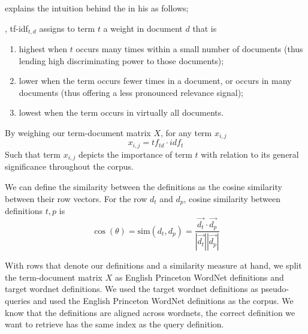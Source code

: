 \citeauthor{manning_introduction_2009} explains the intuition behind the \tfidf{} in his  as follows;
\begin{displayquote}
    \textelp{}, tf-idf$_{t,d}$ assigns to term $t$ a weight in document $d$ that is
    \begin{enumerate}
        \item highest when $t$ occurs many times within a small number of documents (thus lending high discriminating power to those documents);
        \item lower when the term occurs fewer times in a document, or occurs in many documents (thus offering a less pronounced relevance signal);
        \item lowest when the term occurs in virtually all documents.
    \end{enumerate}
\end{displayquote}

By weighing our term-document matrix $X$, for any term $x_{i,j}$
\begin{equation}
    x_{i,j} = tf_{td} \cdot idf_{t}
\end{equation}
Such that term $x_{i,j}$ depicts the importance of term $t$ with relation to its general significance throughout the corpus.

We can define the similarity between the definitions as the cosine similarity between their row vectors.
For the row $d_t$ and $d_p$, cosine similarity between definitions $t, p$ is
\begin{equation}
    \cos(\theta) = \text{sim}(d_t, d_p) = \frac{\vec{d_t} \cdot \vec{d_p}}{|\vec{d_t}||\vec{d_p}|}
\end{equation}

With rows that denote our definitions and a similarity measure at hand, we split the term-document matrix $X$ as English Princeton WordNet definitions and target wordnet definitions.
We used the target wordnet definitions as pseudo-queries and used the English Princeton WordNet definitions as the corpus.
We know that the definitions are aligned across wordnets, the correct definition we want to retrieve has the same index as the query definition.

